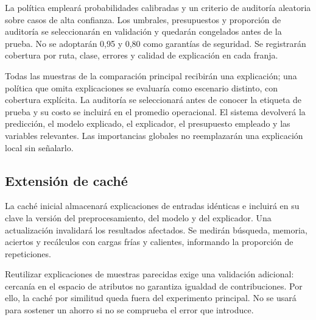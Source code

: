 La política empleará probabilidades calibradas y un criterio de auditoría aleatoria sobre casos de alta confianza. Los umbrales, presupuestos y proporción de auditoría se seleccionarán en validación y quedarán congelados antes de la prueba. No se adoptarán 0,95 y 0,80 como garantías de seguridad. Se registrarán cobertura por ruta, clase, errores y calidad de explicación en cada franja.

Todas las muestras de la comparación principal recibirán una explicación; una política que omita explicaciones se evaluaría como escenario distinto, con cobertura explícita. La auditoría se seleccionará antes de conocer la etiqueta de prueba y su costo se incluirá en el promedio operacional. El sistema devolverá la predicción, el modelo explicado, el explicador, el presupuesto empleado y las variables relevantes. Las importancias globales no reemplazarán una explicación local sin señalarlo.

\subsection{Extensión de caché}
La caché inicial almacenará explicaciones de entradas idénticas e incluirá en su clave la versión del preprocesamiento, del modelo y del explicador. Una actualización invalidará los resultados afectados. Se medirán búsqueda, memoria, aciertos y recálculos con cargas frías y calientes, informando la proporción de repeticiones.

Reutilizar explicaciones de muestras parecidas exige una validación adicional: cercanía en el espacio de atributos no garantiza igualdad de contribuciones. Por ello, la caché por similitud queda fuera del experimento principal. No se usará para sostener un ahorro si no se comprueba el error que introduce.

